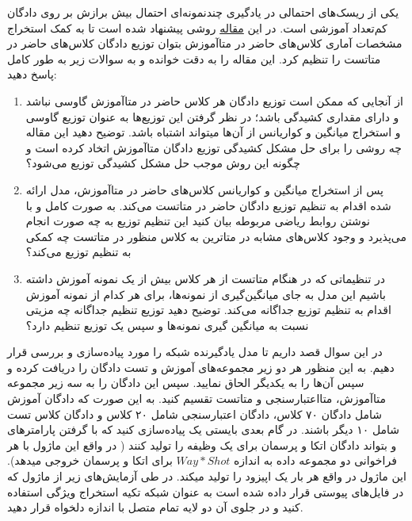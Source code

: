 \documentclass{article}
\begin{document}
یکی از ریسک‌های احتمالی در یادگیری چندنمونه‌ای احتمال بیش برازش بر روی دادگان کم‌تعداد آموزشی است. در این
\href{https://arxiv.org/abs/2101.06395}{مقاله}
روشی پیشنهاد شده است تا به کمک استخراج مشخصات آماری کلاس‌های حاضر در متاآموزش بتوان توزیع دادگان کلاس‌های حاضر در متاتست را تنظیم کرد. این مقاله را به دقت خوانده و به سوالات زیر به طور کامل پاسخ دهید:

\begin{enumerate}

\item
از آنجایی که ممکن است توزیع دادگان هر کلاس حاضر در متاآموزش گاوسی نباشد و دارای مقداری کشیدگی باشد؛ در نظر گرفتن این توزیع‌ها به عنوان توزیع گاوسی و استخراج میانگین و کواریانس از آن‌ها میتواند اشتباه باشد. توضیح دهید این مقاله چه روشی را برای حل مشکل کشیدگی توزیع دادگان متاآموزش اتخاد کرده است و چگونه این روش موجب حل مشکل کشیدگی توزیع می‌شود؟

\item
پس از استخراج میانگین و کواریانس کلاس‌های حاضر در متاآموزش، مدل ارائه شده اقدام به تنظیم توزیع دادگان حاضر در متاتست می‌کند. به صورت کامل و با نوشتن روابط ریاضی مربوطه بیان کنید این تنظیم توزیع به چه صورت انجام می‌پذیرد و وجود کلاس‌های مشابه در متاترین به کلاس منظور در متاتست چه کمکی به تنظیم توزیع می‌کند؟

\item
در تنظیماتی که در هنگام متاتست از هر کلاس بیش از یک نمونه آموزش داشته باشیم این مدل به جای میانگین‌گیری از نمونه‌ها، برای هر کدام از 
نمونه آموزش اقدام به تنظیم توزیع جداگانه می‌کند. توضیح دهید توزیع تنظیم جداگانه چه مزیتی نسبت به میانگین گیری نمونه‌ها و سپس یک توزیع تنظیم دارد؟

\end{enumerate}




در این سوال قصد داریم تا مدل یادگیرنده
شبکه
\href{https://arxiv.org/abs/1703.05175}{}
را مورد پیاده‌سازی و بررسی قرار دهیم. به این منظور هر دو زیر مجموعه‌های آموزش و تست دادگان
را دریافت کرده و سپس آن‌ها را به یکدیگر الحاق نمایید. 
سپس این دادگان را به سه زیر مجموعه
متاآموزش، متااعتبارسنجی و متاتست تقسیم کنید. به این صورت که دادگان آموزش شامل دادگان ۷۰ کلاس، دادگان اعتبارسنجی شامل ۲۰ کلاس و دادگان  کلاس تست شامل ۱۰ دیگر باشند.
در گام بعدی بایستی یک 
پیاده‌سازی کنید که با گرفتن پارامترهای
و
بتواند دادگان
اتکا و پرسمان برای یک وظیفه را تولید کنند ( در واقع این ماژول با هر فراخوانی دو مجموعه داده به اندازه
$Way * Shot$
برای اتکا و پرسمان خروجی میدهد). این ماژول در واقع هر بار یک اپیزود را تولید میکند.
در طی آزمایش‌های زیر از ماژول
که در فایل‌های پیوستی قرار داده شده است به عنوان شبکه  تکیه استخراج ویژگی استفاده کنید و در جلوی آن دو لایه تمام متصل با اندازه دلخواه قرار دهید.
\end{document}
